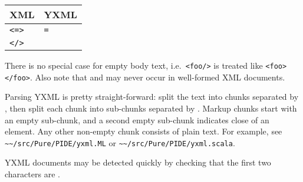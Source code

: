 \begin{isabellebody}
\begin{isamarkuptext}
\begin{enumerate}
  \begin{tabular}{ll}
    XML & YXML \\\hline
    \verb|<|\isa{{\isaliteral{22}{\isachardoublequote}}name\ attribute{\isaliteral{22}{\isachardoublequote}}}\verb|=|\isa{{\isaliteral{22}{\isachardoublequote}}value\ {\isaliteral{5C3C646F74733E}{\isasymdots}}{\isaliteral{22}{\isachardoublequote}}}\verb|>| &
    \isa{{\isaliteral{22}{\isachardoublequote}}\isaliteral{5C3C5E626F6C643E}{}\isactrlbold X\isaliteral{5C3C5E626F6C643E}{}\isactrlbold Yname\isaliteral{5C3C5E626F6C643E}{}\isactrlbold Yattribute{\isaliteral{22}{\isachardoublequote}}}\verb|=|\isa{{\isaliteral{22}{\isachardoublequote}}value{\isaliteral{5C3C646F74733E}{\isasymdots}}\isaliteral{5C3C5E626F6C643E}{}\isactrlbold X{\isaliteral{22}{\isachardoublequote}}} \\
    \verb|</|\isa{name}\verb|>| & \isa{{\isaliteral{22}{\isachardoublequote}}\isaliteral{5C3C5E626F6C643E}{}\isactrlbold X\isaliteral{5C3C5E626F6C643E}{}\isactrlbold Y\isaliteral{5C3C5E626F6C643E}{}\isactrlbold X{\isaliteral{22}{\isachardoublequote}}} \\
  \end{tabular}

  There is no special case for empty body text, i.e.\ \verb|<foo/>| is treated like \verb|<foo></foo>|.  Also note that
   and  may never occur in
  well-formed XML documents.

  \end{enumerate}

  Parsing YXML is pretty straight-forward: split the text into chunks
  separated by , then split each chunk into
  sub-chunks separated by .  Markup chunks start
  with an empty sub-chunk, and a second empty sub-chunk indicates
  close of an element.  Any other non-empty chunk consists of plain
  text.  For example, see \verb|~~/src/Pure/PIDE/yxml.ML| or
  \verb|~~/src/Pure/PIDE/yxml.scala|.

  YXML documents may be detected quickly by checking that the first
  two characters are .%
\end{isamarkuptext}%
\isamarkuptrue%
%
\isadelimtheory
%
\endisadelimtheory
%
\isatagtheory
{}\isamarkupfalse%
%
\endisatagtheory
{\isafoldtheory}%
%
\isadelimtheory
%
\endisadelimtheory
\end{isabellebody}%
